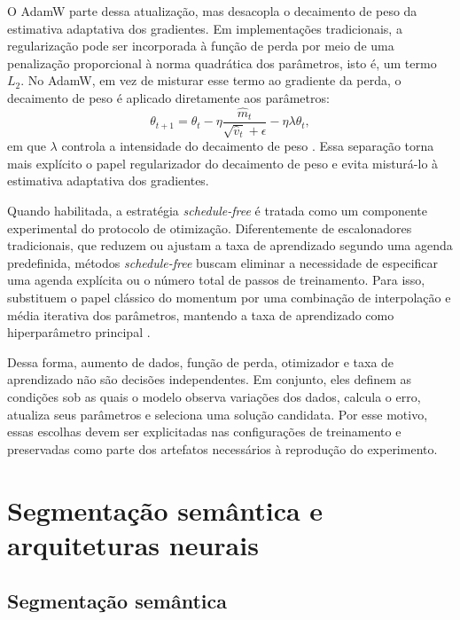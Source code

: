 O AdamW parte dessa atualização, mas desacopla o decaimento de peso da
estimativa adaptativa dos gradientes. Em implementações tradicionais, a
regularização pode ser incorporada à função de perda por meio de uma penalização proporcional à norma quadrática dos parâmetros, isto é, um termo $L_2$. No AdamW, em vez de misturar esse termo ao gradiente da perda, o decaimento de peso é aplicado diretamente aos parâmetros:
\begin{equation}\label{eq:adamw-update}
    \theta_{t+1}
    =
    \theta_t
    -
    \eta
    \frac{\hat{m}_t}{\sqrt{\hat{v}_t}+\epsilon}
    -
    \eta\lambda\theta_t,
\end{equation}
em que $\lambda$ controla a intensidade do decaimento de peso
\cite{loshchilov2019decoupled}. Essa separação torna mais explícito o papel
regularizador do decaimento de peso e evita misturá-lo à estimativa adaptativa
dos gradientes.

Quando habilitada, a estratégia \textit{schedule-free} é tratada como um
componente experimental do protocolo de otimização. Diferentemente de
escalonadores tradicionais, que reduzem ou ajustam a taxa de aprendizado segundo uma agenda predefinida, métodos \textit{schedule-free} buscam eliminar a necessidade de especificar uma agenda explícita ou o número total de passos de treinamento. Para isso, substituem o papel clássico do momentum por uma
combinação de interpolação e média iterativa dos parâmetros, mantendo a taxa de
aprendizado como hiperparâmetro principal \cite{defazio2024road}.

Dessa forma, aumento de dados, função de perda, otimizador e taxa de aprendizado não são decisões independentes. Em conjunto, eles definem as condições sob as quais o modelo observa variações dos dados, calcula o erro, atualiza seus parâmetros e seleciona uma solução candidata. Por esse motivo, essas escolhas devem ser explicitadas nas configurações de treinamento e preservadas como parte dos artefatos necessários à reprodução do experimento.

\section{Segmentação semântica e arquiteturas neurais}
\label{sec:segmentacao_arquiteturas}

\subsection{Segmentação semântica}
\label{subsec:segmentacao_semantica}

